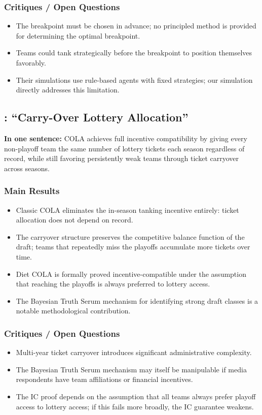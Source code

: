 \documentclass{article}
\begin{document}
\subsubsection*{Critiques / Open Questions}
\begin{itemize}
    \item The breakpoint must be chosen in advance; no principled method is
    provided for determining the optimal breakpoint.
    \item Teams could tank strategically before the breakpoint to position
    themselves favorably.
    \item Their simulations use rule-based agents with fixed strategies; our
    simulation directly addresses this limitation.
\end{itemize}

\subsection{\citet{highley2026}: ``Carry-Over Lottery Allocation''}

\textbf{In one sentence:} COLA achieves full incentive compatibility by giving
every non-playoff team the same number of lottery tickets each season
regardless of record, while still favoring persistently weak teams through
ticket carryover across seasons.

\subsubsection*{Main Results}
\begin{itemize}
    \item Classic COLA eliminates the in-season tanking incentive entirely:
    ticket allocation does not depend on record.
    \item The carryover structure preserves the competitive balance function
    of the draft; teams that repeatedly miss the playoffs accumulate more
    tickets over time.
    \item Diet COLA is formally proved incentive-compatible under the
    assumption that reaching the playoffs is always preferred to lottery access.
    \item The Bayesian Truth Serum mechanism for identifying strong draft
    classes is a notable methodological contribution.
\end{itemize}

\subsubsection*{Critiques / Open Questions}
\begin{itemize}
    \item Multi-year ticket carryover introduces significant administrative
    complexity.
    \item The Bayesian Truth Serum mechanism may itself be manipulable if
    media respondents have team affiliations or financial incentives.
    \item The IC proof depends on the assumption that all teams always prefer
    playoff access to lottery access; if this fails more broadly, the IC
    guarantee weakens.
\end{itemize}
\end{document}

